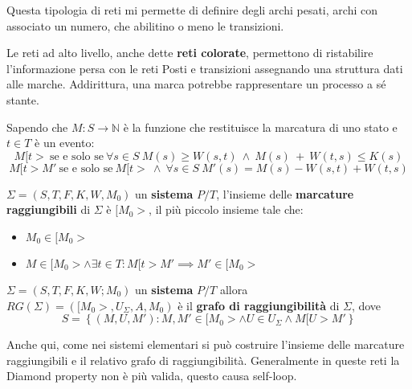 Questa tipologia di reti mi permette di definire degli archi pesati, archi con
associato un numero, che abilitino o meno le transizioni.

Le reti ad alto livello, anche dette \textbf{reti colorate}, permettono di
ristabilire l'informazione persa con le reti Posti e transizioni assegnando una
struttura dati alle marche. Addirittura, una marca potrebbe rappresentare un
processo a sé stante.
\begin{definizione} 
    Sapendo che $M:S\to \mathbb{N}$ è la funzione che restituisce la marcatura di
    uno stato e $t\in T$ è un evento:
    \begin{equation}
        M[t > \ \text{se e solo se} \ \forall s \in S \ M(s) \geq W(s, t) \ \land
        \ M(s) \ + \ W(t, s) \leq K(s)
    \end{equation}
    \begin{equation}
        M[t > M' \ \text{se e solo se} \ M[t > \ \land \ \forall s \in S \ M'(s)
        = M(s) - W(s, t) + W(t, s)
    \end{equation}
\end{definizione}
\begin{definizione}
    $\Sigma = (S,T,F,K,W,M_0)$ un \textbf{sistema} $P/T$, l'insieme delle
    \textbf{marcature raggiungibili} di $\Sigma$ è $[M_0>$, il più piccolo
    insieme tale che:
    \begin{itemize}
        \item $M_0\in [M_0>$
        \item $M\in [M_0>\land \exists t\in T: M[t>M'\implies M' \in [M_0>$
    \end{itemize}
\end{definizione}
\begin{definizione}
    $\Sigma = (S,T,F,K,W;M_0)$ un \textbf{sistema} $P/T$ allora
    $RG(\Sigma)=([M_0>,U_\Sigma,A,M_0)$ è il \textbf{grafo di raggiungibilità}
    di $\Sigma$, dove
    \begin{equation}
        S=\left\{(M,U,M'):M,M'\in [M_0>\land U\in U_\Sigma\land M[U>M' \right\}
    \end{equation}
\end{definizione}
Anche qui, come nei sistemi elementari si può costruire l'insieme delle marcature
raggiungibili e il relativo grafo di raggiungibilità. Generalmente in queste reti
la Diamond property non è più valida, questo causa self-loop.

